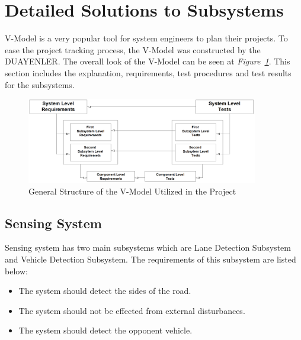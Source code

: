 \documentclass[a4paper,12pt]{article}
\begin{document}
	
	
	
	\section{Detailed Solutions to Subsystems}
	
	V-Model is a very popular tool for system engineers to plan their projects. To ease the project tracking process, the V-Model was constructed by the DUAYENLER. The overall look of the V-Model can be seen at \textit{Figure~\ref{fig:vmodel}}. This section includes the explanation, requirements, test procedures and test results for the subsystems.
		
	\begin{figure}[H]
		\center
		\setlength{\unitlength}{\textwidth} 
		\includegraphics[width=0.9\textwidth]{v-models/V-model}
		\caption{\label{fig:vmodel}General Structure of the V-Model Utilized in the Project}
	\end{figure}
	
	\subsection{Sensing System}
	
	Sensing system has two main subsystems which are Lane Detection Subsystem and Vehicle Detection Subsystem. The requirements of this subsystem are listed below:
	\begin{itemize}
		\item The system should detect the sides of the road.
		\item The system should not be effected from external disturbances.
		\item The system should detect the opponent vehicle.
	\end{itemize}
	
	
\end{document}
